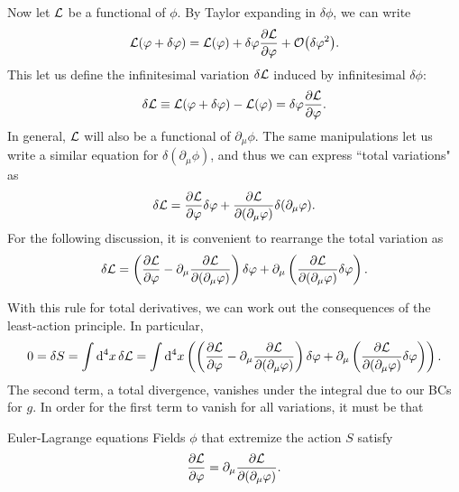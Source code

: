 Now let $\mathcal{L}$ be a functional of $\phi$. By Taylor expanding in $\delta\phi$,
we can write
\begin{equation}
\Lagr(\phi+\delta\phi)=\Lagr(\phi)+\delta\phi\pdv{\Lagr}{\phi}+\order{\delta\phi^2}.
\end{equation}
This let us define the infinitesimal variation $\delta\mathcal{L}$ induced 
by infinitesimal $\delta\phi$:
\begin{equation}
\delta\mathcal{L}\equiv\mathcal{L}(\varphi+\delta\varphi)-\mathcal{L}(\varphi)
=\delta\varphi\pdv{\mathcal{L}}{\varphi}.
\end{equation}
In general, $\mathcal{L}$ will also be a functional of $\partial_\mu\phi$. The same
manipulations let us write a similar equation for $\delta(\partial_\mu\phi)$,
and thus we can express ``total variations" as 
\begin{equation}
\delta\mathcal{L}=\pdv{\mathcal{L}}{\varphi}\delta\varphi+\pdv{\mathcal{L}}{(\partial_\mu\varphi)}\delta(\partial_\mu\varphi).
\end{equation}
For the following discussion, it is convenient to rearrange the total variation
as 
\begin{equation}\label{eq:totalVariation}
\delta\mathcal{L}=
\left(\pdv{\mathcal{L}}{\varphi}-\partial_\mu\pdv{\mathcal{L}}{(\partial_\mu\varphi)}\right)\delta\varphi
+\partial_\mu\left(\pdv{\mathcal{L}}{(\partial_\mu\varphi)}\delta\varphi\right).
\end{equation}

With this rule for total derivatives, we can work out the consequences of the 
least-action principle. In particular,
\begin{equation}
0=\delta S 
=\int\dd[4]{x} \delta\mathcal{L} 
=\int\dd[4]{x}            
\left(\left(\pdv{\mathcal{L}}{\varphi}-\partial_\mu\pdv{\mathcal{L}}{(\partial_\mu\varphi)}\right)\delta\varphi
+\partial_\mu\left(\pdv{\mathcal{L}}{(\partial_\mu\varphi)}\delta\varphi\right)\right).
\end{equation}
The second term, a total divergence, vanishes under the integral due to our BCs
for $g$. In order for the first term to vanish for all variations, it must be
that

\begin{theorem}{Euler-Lagrange equations}{}
Fields $\phi$ that extremize the action $S$ satisfy
$$
\pdv{\mathcal{L}}{\varphi}=\partial_\mu\pdv{\mathcal{L}}{(\partial_\mu\varphi)}.
$$
\end{theorem}

